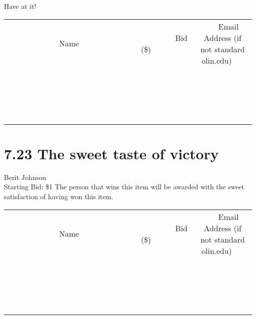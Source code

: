 \documentclass[11pt]{article}
\begin{document}
Have at it!
\\[3ex]
\begin{tabular}{c c c}
~~~~~~~~~~~~~Name~~~~~~~~~~~~~ & ~~~~~~~~~Bid (\$)~~~~~~~~~  & ~~~Email Address (if not standard olin.edu)~~~\\
 & & \\
\hline
 & & \\
\hline
 & & \\
\hline
 & & \\
\hline
 & & \\
\hline
 & & \\
\hline
 & & \\
\hline
 & & \\
\hline
 & & \\
\hline
 & & \\
\hline
 & & \\
\hline
 & & \\
\hline
 & & \\
\hline
 & & \\
\hline
 & & \\
\hline
 & & \\
\hline
 & & \\
\hline
 & & \\
\hline
 & & \\
\hline
\end{tabular}
\newpage
\section*{7.23 The sweet taste of victory}
Berit Johnson
\\
Starting Bid: \$1
\newline
The person that wins this item will be awarded with the sweet satisfaction of having won this item.
\\[3ex]
\begin{tabular}{c c c}
~~~~~~~~~~~~~Name~~~~~~~~~~~~~ & ~~~~~~~~~Bid (\$)~~~~~~~~~  & ~~~Email Address (if not standard olin.edu)~~~\\
 & & \\
\hline
 & & \\
\hline
 & & \\
\hline
 & & \\
\hline
 & & \\
\hline
 & & \\
\hline
 & & \\
\hline
 & & \\
\hline
 & & \\
\hline
 & & \\
\hline
 & & \\
\hline
 & & \\
\hline
 & & \\
\hline
 & & \\
\hline
 & & \\
\hline
 & & \\
\hline
 & & \\
\hline
 & & \\
\hline
 & & \\
\hline
\end{tabular}
\newpage
\end{document}
